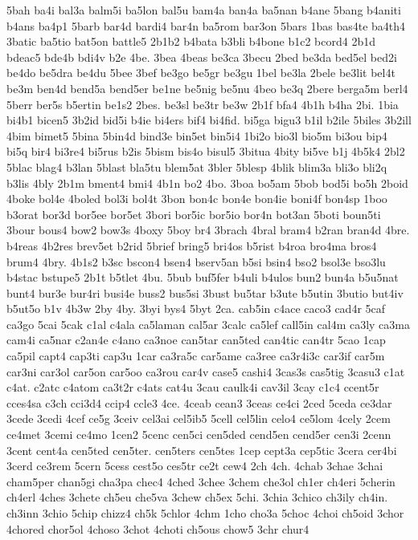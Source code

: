 {5bah
ba4i
bal3a
balm5i
ba5lon
bal5u
bam4a
ban4a
ba5nan
b4ane
5bang
b4aniti
b4ans
ba4p1
5barb
bar4d
bardi4
bar4n
ba5rom
bar3on
5bars
1bas
bas4te
ba4th4
3batic
ba5tio
bat5on
battle5
2b1b2
b4bata
b3bli
b4bone
b1c2
bcord4
2b1d
bdeac5
bde4b
bdi4v
b2e
4be.
3bea
4beas
be3ca
3becu
2bed
be3da
bed5el
bed2i
be4do
be5dra
be4du
5bee
3bef
be3go
be5gr
be3gu
1bel
be3la
2bele
be3lit
bel4t
be3m
ben4d
bend5a
bend5er
be1ne
be5nig
be5nu
4beo
be3q
2bere
berga5m
berl4
5berr
ber5s
b5ertin
be1s2
2bes.
be3sl
be3tr
be3w
2b1f
bfa4
4b1h
b4ha
2bi.
1bia
bi4b1
bicen5
3b2id
bid5i
b4ie
bi4ers
bif4
bi4fid.
bi5ga
bigu3
b1il
b2ile
5biles
3b2ill
4bim
bimet5
5bina
5bin4d
bind3e
bin5et
bin5i4
1bi2o
bio3l
bio5m
bi3ou
bip4
bi5q
bir4
bi3re4
bi5rus
b2is
5bism
bis4o
bisul5
3bitua
4bity
bi5ve
b1j
4b5k4
2bl2
5blac
blag4
b3lan
5blast
bla5tu
blem5at
3bler
5blesp
4blik
blim3a
bli3o
bli2q
b3lis
4bly
2b1m
bment4
bmi4
4b1n
bo2
4bo.
3boa
bo5am
5bob
bod5i
bo5h
2boid
4boke
bol4e
4boled
bol3i
bol4t
3bon
bon4c
bon4e
bon4ie
boni4f
bon4sp
1boo
b3orat
bor3d
bor5ee
bor5et
3bori
bor5ic
bor5io
bor4n
bot3an
5boti
boun5ti
3bour
bous4
bow2
bow3s
4boxy
5boy
br4
3brach
4bral
bram4
b2ran
bran4d
4bre.
b4reas
4b2res
brev5et
b2rid
5brief
bring5
bri4os
b5rist
b4roa
bro4ma
bros4
brum4
4bry.
4b1s2
b3sc
bscon4
bsen4
bserv5an
b5si
bsin4
bso2
bsol3e
bso3lu
b4stac
bstupe5
2b1t
b5tlet
4bu.
5bub
buf5fer
b4uli
b4ulos
bun2
bun4a
b5u5nat
bunt4
bur3e
bur4ri
busi4e
buss2
bus5si
3bust
bu5tar
b3ute
b5utin
3butio
but4iv
b5ut5o
b1v
4b3w
2by
4by.
3byi
bys4
5byt
2ca.
cab5in
c4ace
caco3
cad4r
5caf
ca3go
5cai
5cak
c1al
c4ala
ca5laman
cal5ar
3calc
ca5lef
call5in
cal4m
ca3ly
ca3ma
cam4i
ca5nar
c2an4e
c4ano
ca3noe
can5tar
can5ted
can4tic
can4tr
5cao
1cap
ca5pil
capt4
cap3ti
cap3u
1car
ca3ra5c
car5ame
ca3ree
ca3r4i3c
car3if
car5m
car3ni
car3ol
car5on
car5oo
ca3rou
car4v
case5
cashi4
3cas3s
cas5tig
3casu3
c1at
c4at.
c2atc
c4atom
ca3t2r
c4ats
cat4u
3cau
caulk4i
cav3il
3cay
c1c4
ccent5r
cces4sa
c3ch
cci3d4
ccip4
ccle3
4ce.
4ceab
cean3
3ceas
ce4ci
2ced
5ceda
ce3dar
3cede
3cedi
4cef
ce5g
3ceiv
cel3ai
cel5ib5
5cell
cel5lin
celo4
ce5lom
4cely
2cem
ce4met
3cemi
ce4mo
1cen2
5cenc
cen5ci
cen5ded
cend5en
cend5er
cen3i
2cenn
3cent
cent4a
cen5ted
cen5ter.
cen5ters
cen5tes
1cep
cept3a
cep5tic
3cera
cer4bi
3cerd
ce3rem
5cern
5cess
cest5o
ces5tr
ce2t
cew4
2ch
4ch.
4chab
3chae
3chai
cham5per
chan5gi
cha3pa
chec4
4ched
3chee
3chem
che3ol
ch1er
ch4eri
5cherin
ch4erl
4ches
3chete
ch5eu
che5va
3chew
ch5ex
5chi.
3chia
3chico
ch3ily
ch4in.
ch3inn
3chio
5chip
chizz4
ch5k
5chlor
4chm
1cho
cho3a
5choc
4choi
ch5oid
3chor
4chored
chor5ol
4choso
3chot
4choti
ch5ous
chow5
3chr
chur4
}
